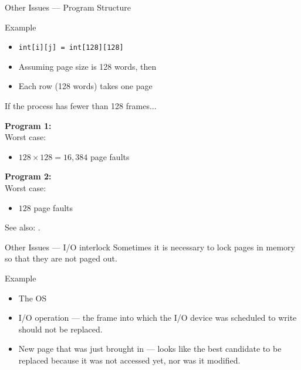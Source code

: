 \begin{frame}{Other Issues --- Program Structure}
  \begin{iblock}{Example}
    \begin{itemize}
    \item \texttt{int[i][j] = int[128][128]}
    \item Assuming page size is 128 words, then
    \item Each row (128 words) takes one page
    \end{itemize}
    If the process has fewer than 128 frames...\\[1ex]
    \begin{minipage}[t]{.5\linewidth}
      \textbf{Program 1:}\\[1ex]
      Worst case:
      \begin{itemize}
      \item[] $128 \times 128 = 16,384$ page faults
      \end{itemize}
    \end{minipage}\qquad
    \begin{minipage}[t]{.4\linewidth}
      \textbf{Program 2:}\\[1ex]
      Worst case:
      \begin{itemize}
      \item[] $128$ page faults
      \end{itemize}
    \end{minipage}
  \end{iblock}
\end{frame}

See also: .

\begin{frame}{Other Issues --- I/O interlock}
  Sometimes it is necessary to lock pages in memory so that they are not paged out.
  \begin{iblock}{Example}
    \begin{itemize}
    \item The OS
    \item I/O operation --- the frame into which the I/O device was scheduled to write
      should not be replaced.
    \item New page that was just brought in --- looks like the best candidate to be
      replaced because it was not accessed yet, nor was it modified.
    \end{itemize}
  \end{iblock}
\end{frame}

